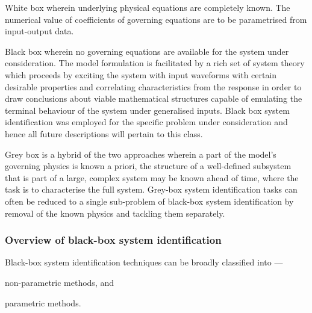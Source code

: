 \begin{enumdescriptnum}[leftmargin=!,itemsep=1ex,labelwidth=\widthof{$\symbf{\text{brugg}_j}\ \scriptstyle (\times 3)$abc}
    ,partopsep=0pt
    ,topsep=0pt
    ]

\item[White box] wherein underlying physical equations are completely known. The
numerical value  of coefficients of  governing equations are to  be parametrised
from input-output data.

\item[Black box]  wherein no  governing equations are  available for  the system
under  consideration. The  model formulation  is facilitated  by a  rich set  of
system theory  which proceeds by exciting  the system with input  waveforms with
certain desirable  properties and correlating characteristics  from the response
in order  to draw  conclusions about viable  mathematical structures  capable of
emulating  the  terminal  behaviour  of the  system  under  generalised  inputs.
Black  box system  identification was  employed for  the specific  problem under
consideration and hence all future descriptions will pertain to this class.

\item[Grey box] is a hybrid of the  two approaches wherein a part of the model's
governing  physics is  known a  priori, \eg{}  the structure  of a  well-defined
subsystem  that is  part  of a  large,  complex  system may  be  known ahead  of
time,  where the  task  is  to characterise  the  full  system. Grey-box  system
identification tasks can  often be reduced to a single  sub-problem of black-box
system  identification  by  removal  of  the known  physics  and  tackling  them
separately.

\end{enumdescriptnum}

\subsubsection*{Overview of black-box system identification}\label{subsubsec:introblackboxsysid}
Black-box system identification techniques can be broadly classified into ---
\begin{enumerate*}[label=\emph{\alph*})]
     \item non-parametric methods, and
     \item parametric methods.
 \end{enumerate*}

